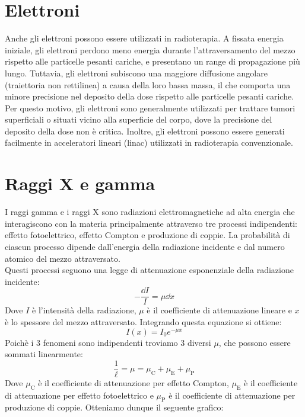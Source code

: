 
\section{Elettroni}
Anche gli elettroni possono essere utilizzati in radioterapia. A fissata energia iniziale, gli elettroni perdono meno energia durante l'attraversamento del mezzo rispetto alle particelle pesanti cariche, e presentano un range di propagazione più lungo. Tuttavia, gli elettroni subiscono una maggiore diffusione angolare (traiettoria non rettilinea) a causa della loro bassa massa, il che comporta una minore precisione nel deposito della dose rispetto alle particelle pesanti cariche. Per questo motivo, gli elettroni sono generalmente utilizzati per trattare tumori superficiali o situati vicino alla superficie del corpo, dove la precisione del deposito della dose non è critica. Inoltre, gli elettroni possono essere generati facilmente in acceleratori lineari (linac) utilizzati in radioterapia convenzionale.


\section{Raggi X e gamma}
I raggi gamma e i raggi X sono radiazioni elettromagnetiche ad alta energia che interagiscono con la materia principalmente attraverso tre processi indipendenti: effetto fotoelettrico, effetto Compton e produzione di coppie. La probabilità di ciascun processo dipende dall'energia della radiazione incidente e dal numero atomico del mezzo attraversato.\\
Questi processi seguono una legge di attenuazione esponenziale della radiazione incidente:
\begin{equation}
    -\dfrac{\dd{I}}{I} = \mu \dd{x}
\end{equation}
Dove $I$ è l'intensità della radiazione, $\mu$ è il coefficiente di attenuazione lineare e $x$ è lo spessore del mezzo attraversato. Integrando questa equazione si ottiene:
\begin{equation}
    I(x) = I_0 e^{-\mu x}
\end{equation}
Poichè i 3 fenomeni sono indipendenti troviamo 3 diversi $\mu$, che possono essere sommati linearmente:
\begin{equation}
    \dfrac{1}{\ell} = \mu = \mu_{\text{C}} + \mu_{\text{E}} + \mu_{\text{P}}
\end{equation}
Dove $\mu_{\text{C}}$ è il coefficiente di attenuazione per effetto Compton, $\mu_{\text{E}}$ è il coefficiente di attenuazione per effetto fotoelettrico e $\mu_{\text{P}}$ è il coefficiente di attenuazione per produzione di coppie. Otteniamo dunque il seguente grafico:

